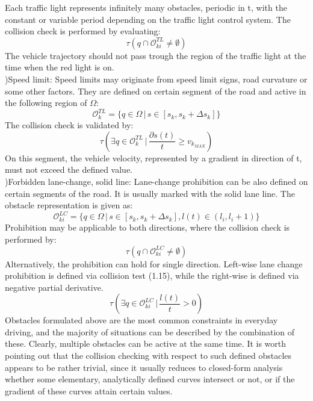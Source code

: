 \documentclass{report}
\begin{document}
Each traffic light represents infinitely many obstacles, periodic in t, with the constant or variable period depending
on the traffic light control system. The collision check is performed by evaluating:
\begin{equation}
	\tau(q \cap \mathcal{O}_{ki}^{TL} \neq \emptyset)
\end{equation}
The vehicle trajectory should not pass trough the region of the traffic light at the time when the red light is on.\\
)Speed limit: Speed limits may originate from speed limit signs, road curvature or some other factors. They are defined on certain segment of the road and active in the following region of $\Omega$:
\begin{equation}
\mathcal{O}_{k}^{TL} = \{ q \in \Omega\,|\,
s \in [s_k, s_k + \Delta s_k]\}
\end{equation}
The collision check is validated by:
\begin{equation}
\tau(\exists q \in \mathcal{O}_{k}^{TL} \,|\, \frac{\partial s(t)}{t} \geq v_{k_{MAX}} )
\end{equation}
On this segment, the vehicle velocity, represented by a gradient in direction of t, must not exceed the defined value.\\
)Forbidden lane-change, solid line: Lane-change prohibition can be also defined on certain segments of the road. It is usually marked with the solid lane line. The obstacle representation is given as:
\begin{equation}
\mathcal{O}_{ki}^{LC} = \{ q \in \Omega \,|\,s \in [s_k, s_k + \Delta s_k],l(t) \in (l_i, l_i+1) \}
\end{equation}
Prohibition may be applicable to both directions, where the collision check is performed by:
\begin{equation}
\tau(q \cap \mathcal{O}_{ki}^{LC} \neq \emptyset)
\end{equation}
Alternatively, the prohibition can hold for single direction. Left-wise lane change prohibition is defined via collision
test (1.15), while the right-wise is defined via negative partial
derivative.
\begin{equation}
\tau(\exists q \in \mathcal{O}_{ki}^{LC} \,|\, \frac{l(t)}{t} > 0)
\end{equation}
Obstacles formulated above are the most common constraints in everyday driving, and the majority of situations can be described by the combination of these. Clearly, multiple obstacles can be active at the same time. It is worth pointing out that the collision checking with respect to such defined obstacles appears to be rather trivial, since it usually reduces to closed-form analysis whether some elementary, analytically defined curves intersect or not, or if the gradient of these curves attain certain values.
\end{document}
